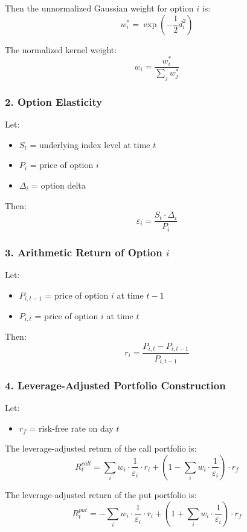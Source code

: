 \documentclass[11pt]{article}
\begin{document}
Then the unnormalized Gaussian weight for option $i$ is:
\[
w_{i}^* = \exp\left( -\frac{1}{2} d_{i}^2 \right)
\]

The normalized kernel weight:
\[
w_{i} = \frac{w_{i}^*}{\sum_j w_j^*}
\]

\subsubsection{2. Option Elasticity}

Let:
\begin{itemize}
  \item $S_{t}$ = underlying index level at time $t$
  \item $P_{i}$ = price of option $i$
  \item $\Delta_{i}$ = option delta
\end{itemize}

Then:
\[
\varepsilon_{i} = \frac{S_t \cdot \Delta_{i}}{P_{i}}
\]

\subsubsection{3. Arithmetic Return of Option $i$}

Let:
\begin{itemize}
  \item $P_{i,t-1}$ = price of option $i$ at time $t-1$
  \item $P_{i,t}$ = price of option $i$ at time $t$
\end{itemize}

Then:
\[
r_{i} = \frac{P_{i,t} - P_{i,t-1}}{P_{i,t-1}}
\]

\subsubsection{4. Leverage-Adjusted Portfolio Construction}

Let:
\begin{itemize}
  \item $r_{f}$ = risk-free rate on day $t$
\end{itemize}

The leverage-adjusted return of the call portfolio is:
\[
R_t^{call} = \sum_{i} w_{i} \cdot \frac{1}{\varepsilon_{i}} \cdot r_{i} + \left(1 - \sum_{i} w_{i} \cdot \frac{1}{\varepsilon_{i}} \right) \cdot r_f
\]

The leverage-adjusted return of the put portfolio is:
\[
R_t^{put} = -\sum_{i} w_{i} \cdot \frac{1}{\varepsilon_{i}} \cdot r_{i} + \left(1 + \sum_{i} w_{i} \cdot \frac{1}{\varepsilon_{i}} \right) \cdot r_f
\]
\end{document}
